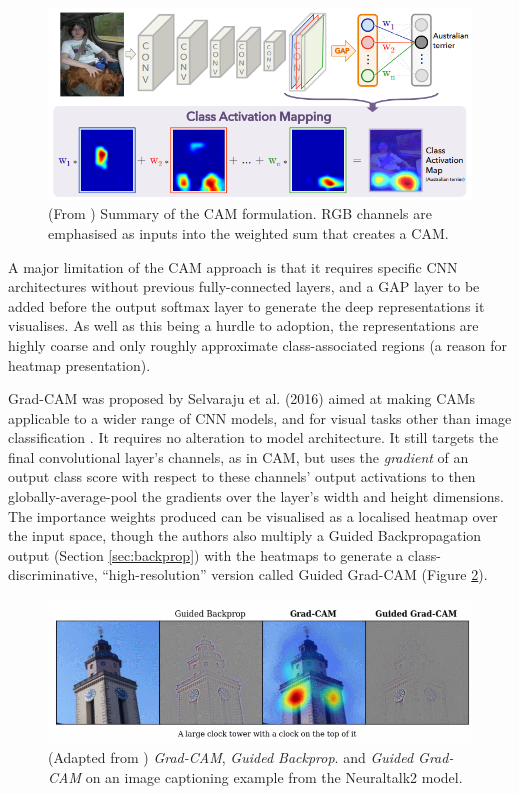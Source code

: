 \documentclass[main]{subfiles}
\begin{document}
\begin{figure}[h]
\centering
\includegraphics[scale=0.5]{cam.png}
\caption{(From \cite{cam}) Summary of the CAM formulation. RGB channels are emphasised as inputs into the weighted sum that creates a CAM.}
\label{camimg}
\end{figure}

A major limitation of the CAM approach is that it requires specific CNN architectures without previous fully-connected layers, and a GAP layer to be added before the output softmax layer to generate the deep representations it visualises. As well as this being a hurdle to adoption, the representations are highly coarse and only roughly approximate class-associated regions (a reason for heatmap presentation).

Grad-CAM was proposed by Selvaraju et al. (2016) aimed at making CAMs applicable to a wider range of CNN models, and for visual tasks other than image classification \cite{gradcam}. It requires no alteration to model architecture. It still targets the final convolutional layer's channels, as in CAM, but uses the \textit{gradient} of an output class score with respect to these channels' output activations to then globally-average-pool the gradients over the layer's width and height dimensions. The importance weights produced can be visualised as a localised heatmap over the input space, though the authors also multiply a Guided Backpropagation output (Section \ref{sec:backprop}) with the heatmaps to generate a class-discriminative, ``high-resolution'' version called Guided Grad-CAM (Figure \ref{gradimg}).

\begin{figure}[h]
\centering
\includegraphics[scale=0.6]{gradcam_I.png}
\caption{(Adapted from \cite{gradcam}) \textit{Grad-CAM}, \textit{Guided Backprop}. and \textit{Guided Grad-CAM} on an image captioning example from the Neuraltalk2 model.}
\label{gradimg}
\end{figure}
\end{document}
